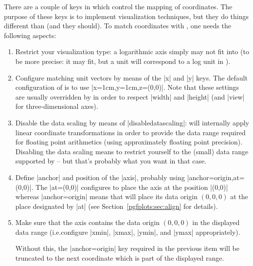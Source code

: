 There are a couple of keys in \PGFPlots{} which control the mapping of
coordinates. The purpose of these keys is to implement visualization
techniques, but they do things different than \Tikz{} (and they should). To
match coordinates with \Tikz{}, one needs the following aspects:
%
\begin{enumerate}
    \item Restrict your visualization type: a logarithmic axis simply may not
        fit into \Tikz{} (to be more precise: it may fit, but a \Tikz{} unit
        will correspond to a log unit in \PGFPlots).
    \item Configure matching unit vectors by means of the |x| and |y| keys.
        The default configuration of \Tikz{} is to use
        |x=1cm,y=1cm,z={(0,0)}|. Note that these settings are usually
        overridden by \PGFPlots{} in order to respect |width| and |height|
        (and |view| for three-dimensional axes).
    \item Disable the data scaling by means of |disabledatascaling|:
        \PGFPlots{} will internally apply linear coordinate transformations
        in order to provide the data range required for floating point
        arithmetics (using approximately floating point precision). Disabling
        the data scaling means to restrict yourself to the (small) data range
        supported by \Tikz{} -- but that's probably what you want in that
        case.
    \item Define |anchor| and position of the |axis|, probably using
        |anchor=origin,at={(0,0)}|. The |at={(0,0)}| configures \PGFPlots{}
        to place the axis at the \Tikz{} position |(0,0)| whereas
        |anchor=origin| means that \PGFPlots{} will place its data origin
        $(0,0,0)$ at the place designated by |at| (see
        Section~\ref{pgfplots:sec:align} for details).
    \item Make sure that the \PGFPlots{} axis contains the data origin
        $(0,0,0)$ in the displayed data range (i.e.\@ configure |xmin|,
        |xmax|, |ymin|, and |ymax| appropriately).

        Without this, the |anchor=origin| key required in the previous item
        will be truncated to the next coordinate which is part of the displayed
        range.
\end{enumerate}

